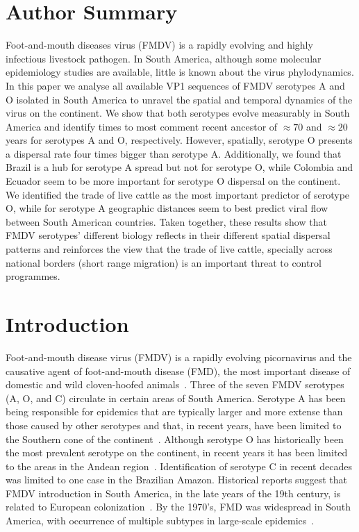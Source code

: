 \documentclass[10pt]{article}
\begin{document}
\section*{Author Summary} %
Foot-and-mouth diseases virus (FMDV) %
is a rapidly evolving and highly infectious livestock pathogen.
In South America, although some molecular epidemiology studies are available, little is known about the virus phylodynamics.
In this paper we analyse all available VP1 sequences of FMDV serotypes A and O isolated in South America to unravel the spatial and temporal dynamics of the virus on the continent.
We show that both serotypes evolve measurably in South America and identify times to most comment recent ancestor of $\approx 70$ and $\approx 20$ years for serotypes A and O, respectively. 
However, spatially, serotype O presents a dispersal rate four times bigger than serotype A.
Additionally, we found that Brazil is a hub for serotype A spread but not for serotype O, while Colombia and Ecuador seem to be more important for serotype O dispersal on the continent.
We identified the trade of live cattle as the most important predictor of serotype O, while for serotype A geographic distances seem to best predict viral flow between South American countries.
Taken together, these results show that FMDV serotypes' different biology reflects in their different spatial dispersal patterns and reinforces the view that the trade of live cattle, specially across national %
borders (short range migration) is an important threat to control programmes.   

\section*{Introduction}

Foot-and-mouth disease virus (FMDV) is a rapidly evolving picornavirus and the causative agent of foot-and-mouth disease (FMD), the most important disease of domestic and wild cloven-hoofed animals~\cite{review}.
Three of the seven FMDV serotypes (A, O, and C) circulate in certain areas of South America.
Serotype A has been being responsible for epidemics that are typically larger and more extense than those caused by other serotypes and that, in recent years, have been limited to the 
Southern cone of the continent~\cite{Perez2001, Malirat2012}.
Although serotype O has historically been the most prevalent serotype on the continent, in recent years it has been limited to the areas in the Andean region~\cite{andean}.
Identification of serotype C in recent decades was limited to one case in the Brazilian Amazon.
Historical reports suggest that FMDV introduction in South America, in the late years of the 19th century, is  related to European colonization~\cite{tully}. 
By the 1970's, FMD was widespread in South America, with occurrence of multiple subtypes in large-scale epidemics~\cite{Saraiva2003}.
\end{document}
